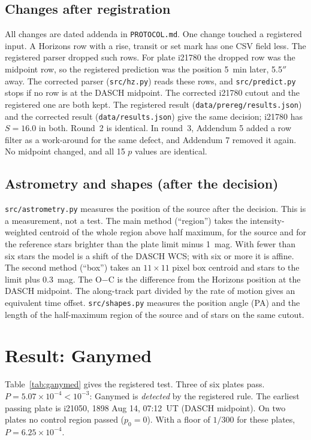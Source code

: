 \documentclass[11pt]{article}
\newcommand{\as}{$''$}
\begin{document}
\subsection{Changes after registration}\label{sec:changes}
All changes are dated addenda in \texttt{PROTOCOL.md}. One change touched a registered input. A Horizons row with a rise, transit or set mark has one CSV field less. The registered parser dropped such rows. For plate i21780 the dropped row was the midpoint row, so the registered prediction was the position 5~min later, 5.5\as{} away. The corrected parser (\texttt{src/hz.py}) reads these rows, and \texttt{src/predict.py} stops if no row is at the DASCH midpoint. The corrected i21780 cutout and the registered one are both kept. The registered result (\texttt{data/prereg/results.json}) and the corrected result (\texttt{data/results.json}) give the same decision; i21780 has $S=16.0$ in both. Round~2 is identical. In round~3, Addendum 5 added a row filter as a work-around for the same defect, and Addendum 7 removed it again. No midpoint changed, and all 15 $p$ values are identical.

\subsection{Astrometry and shapes (after the decision)}
\texttt{src/astrometry.py} measures the position of the source after the decision. This is a measurement, not a test. The main method (``region'') takes the intensity-weighted centroid of the whole region above half maximum, for the source and for the reference stars brighter than the plate limit minus 1~mag. With fewer than six stars the model is a shift of the DASCH WCS; with six or more it is affine. The second method (``box'') takes an $11\times11$ pixel box centroid and stars to the limit plus 0.3~mag. The O$-$C is the difference from the Horizons position at the DASCH midpoint. The along-track part divided by the rate of motion gives an equivalent time offset. \texttt{src/shapes.py} measures the position angle (PA) and the length of the half-maximum region of the source and of stars on the same cutout.

\section{Result: Ganymed}
Table~\ref{tab:ganymed} gives the registered test. Three of six plates pass. $P=5.07\times10^{-4}<10^{-3}$: Ganymed is \emph{detected} by the registered rule. The earliest passing plate is i21050, 1898 Aug 14, 07:12~UT (DASCH midpoint). On two plates no control region passed ($p_0=0$). With a floor of $1/300$ for these plates, $P=6.25\times10^{-4}$.
\end{document}
